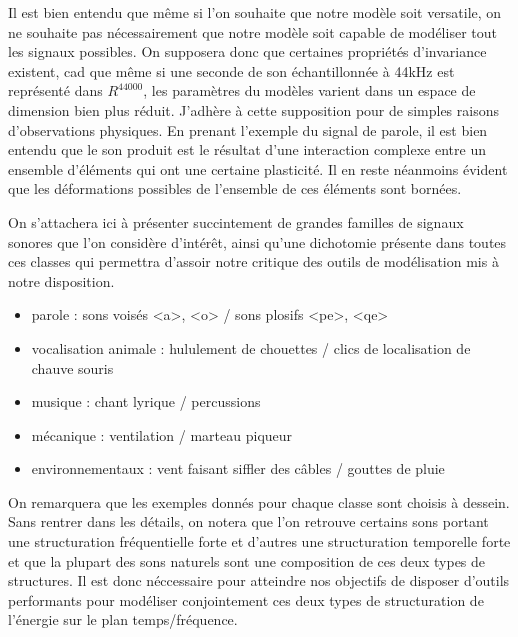 Il est bien entendu que même si l'on souhaite que notre modèle soit versatile, on ne souhaite pas nécessairement que notre modèle soit capable de modéliser tout les signaux possibles. On supposera donc que certaines propriétés d'invariance existent, cad que même si une seconde de son échantillonnée à 44kHz est représenté dans $R^44000$, les paramètres du modèles varient dans un espace de dimension bien plus réduit. J'adhère à cette supposition pour de simples raisons d'observations physiques. En prenant l'exemple du signal de parole, il est bien entendu que le son produit est le résultat d'une interaction complexe entre un ensemble d'éléments qui ont une certaine plasticité. Il en reste néanmoins évident que les déformations possibles de l'ensemble de ces éléments sont bornées.

On s'attachera ici à présenter succintement de grandes familles de signaux sonores que l'on considère d'intérêt, ainsi qu'une dichotomie présente dans toutes ces classes qui permettra d'assoir notre critique des outils de modélisation mis à notre disposition.

\begin{itemize}
  \item parole : sons voisés <a>, <o> / sons plosifs <pe>, <qe>
  \item vocalisation animale : hululement de chouettes / clics de localisation de chauve souris
  \item musique : chant lyrique / percussions
  \item mécanique : ventilation / marteau piqueur
  \item environnementaux : vent faisant siffler des câbles / gouttes de pluie
\end{itemize}

On remarquera que les exemples donnés pour chaque classe sont choisis à dessein. Sans rentrer dans les détails, on notera que l'on retrouve certains sons portant une structuration fréquentielle forte et d'autres une structuration temporelle forte et que la plupart des sons naturels sont une composition de ces deux types de structures. Il est donc néccessaire pour atteindre nos objectifs de disposer d'outils performants pour modéliser conjointement ces deux types de structuration de l'énergie sur le plan temps/fréquence.

